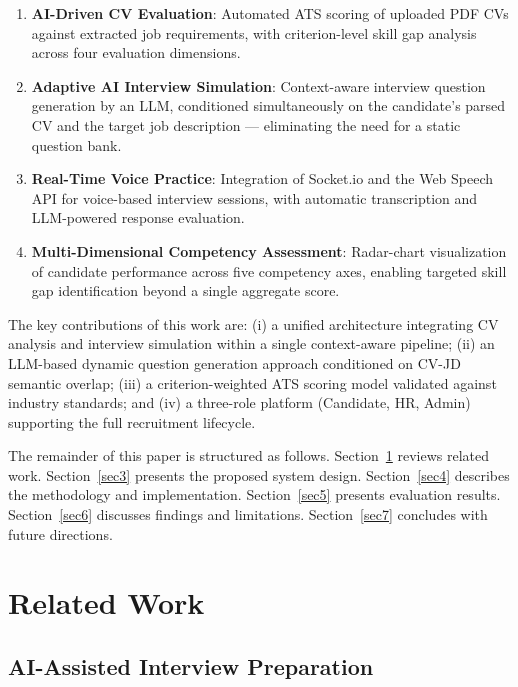 \documentclass[pdflatex,sn-mathphys-num]{sn-jnl}%
\theoremstyle{thmstyleone}%
\theoremstyle{thmstyletwo}%
\theoremstyle{thmstylethree}%
\begin{document}
\begin{enumerate}
  \item \textbf{AI-Driven CV Evaluation}: Automated ATS scoring of uploaded PDF CVs against extracted job requirements, with criterion-level skill gap analysis across four evaluation dimensions.
  \item \textbf{Adaptive AI Interview Simulation}: Context-aware interview question generation by an LLM, conditioned simultaneously on the candidate's parsed CV and the target job description — eliminating the need for a static question bank.
  \item \textbf{Real-Time Voice Practice}: Integration of Socket.io and the Web Speech API for voice-based interview sessions, with automatic transcription and LLM-powered response evaluation.
  \item \textbf{Multi-Dimensional Competency Assessment}: Radar-chart visualization of candidate performance across five competency axes, enabling targeted skill gap identification beyond a single aggregate score.
\end{enumerate}

The key contributions of this work are: (i) a unified architecture integrating CV analysis and interview simulation within a single context-aware pipeline; (ii) an LLM-based dynamic question generation approach conditioned on CV-JD semantic overlap; (iii) a criterion-weighted ATS scoring model validated against industry standards; and (iv) a three-role platform (Candidate, HR, Admin) supporting the full recruitment lifecycle.

The remainder of this paper is structured as follows. Section~\ref{sec2} reviews related work. Section~\ref{sec3} presents the proposed system design. Section~\ref{sec4} describes the methodology and implementation. Section~\ref{sec5} presents evaluation results. Section~\ref{sec6} discusses findings and limitations. Section~\ref{sec7} concludes with future directions.

\section{Related Work}\label{sec2}

\subsection{AI-Assisted Interview Preparation}\label{subsec2-1}
\end{document}
